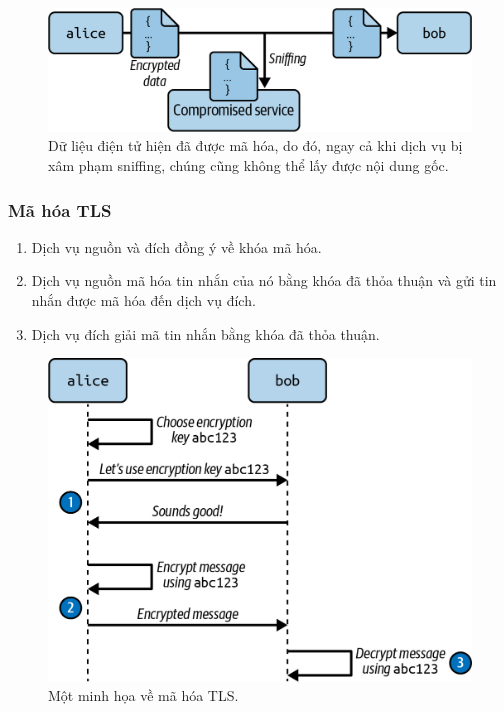 \documentclass[14pt,a4paper]{report}
\begin{document}
{	\hspace{0.3cm}{Mã hóa ngăn chặn các cuộc tấn công trung gian vì những kẻ tấn công không thể đọc dữ liệu được gửi giữa hai dịch vụ. Chỉ dịch vụ đích mới có thể giải mã dữ liệu. Như thể hiện trong hình, nếu Bob là dịch vụ duy nhất có khả năng giải mã lưu lượng truy cập từ dịch vụ Alice, thì việc kẻ tấn công chặn lưu lượng cũng không thành vấn đề.\\}
	
	\begin{figure}[h]
		\centering
		\includegraphics[width=0.7\linewidth]{Pics/encrypt_prevent_sniffing}
		\caption{\label{fig:encryptpreventsniffing} Dữ liệu điện tử hiện đã được mã hóa, do đó, ngay cả khi dịch vụ bị xâm phạm sniffing, chúng cũng không thể lấy được nội dung gốc.}
		\label{fig:encryptpreventsniffing}
	\end{figure}
	
	\hspace{0.3cm}{Consul sử dụng mã hóa TLS để mã hóa lưu lượng giữa các dịch vụ.}
	
	\subsubsection{Mã hóa TLS}
	\hspace{1cm}{Mã hóa TLS có ba bước (xem Hình 2.16 để biết minh họa):}
	\begin{enumerate}
	\item Dịch vụ nguồn và đích đồng ý về khóa mã hóa.
	\item Dịch vụ nguồn mã hóa tin nhắn của nó bằng khóa đã thỏa thuận và gửi tin nhắn được mã hóa đến dịch vụ đích.
	\item Dịch vụ đích giải mã tin nhắn bằng khóa đã thỏa thuận.
	\end{enumerate}

	\begin{figure}[h]
		\centering
		\includegraphics[width=0.7\linewidth]{Pics/TLS}
		\caption{\label{fig:tls} Một minh họa về mã hóa TLS.}
		\label{fig:tls}
	\end{figure}
	
}
\end{document}
